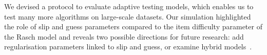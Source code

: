 \documentclass{sig-alternate}
\begin{document}



We devised a protocol to evaluate adaptive testing models, which enables us to test many more algorithms on large-scale datasets. Our simulation highlighted the role of slip and guess parameters compared to the item difficulty parameter of the Rasch model and reveals two possible directions for future research: add regularisation parameters linked to slip and guess, or examine hybrid models~\cite{McGlohen2008}.








\end{document}
